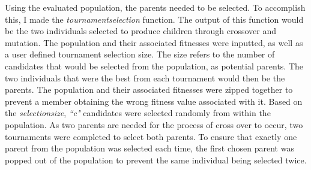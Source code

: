 \documentclass[11pt]{article}
\begin{document}
Using the evaluated population, the parents needed to be selected. To accomplish this, I made the \textit{tournament\textunderscore selection} function. The output of this function would be the two individuals selected to produce children through crossover and mutation. 
The population and their associated fitnesses were inputted, as well as a user defined tournament selection size. The size refers to the number of candidates that would be selected from the population, as potential parents. The two individuals that were the best from each tournament would then be the parents. The population and their associated fitnesses were zipped together to prevent a member obtaining the wrong fitness value associated with it. Based on the \textit{selection\textunderscore size}, \textit{``c"} candidates were selected randomly from within the population. As two parents are needed for the process of cross over to occur, two tournaments were completed to select both parents. To ensure that exactly one parent from the population was selected each time, the first chosen parent was popped out of the population to prevent the same individual being selected twice. 
\end{document}
